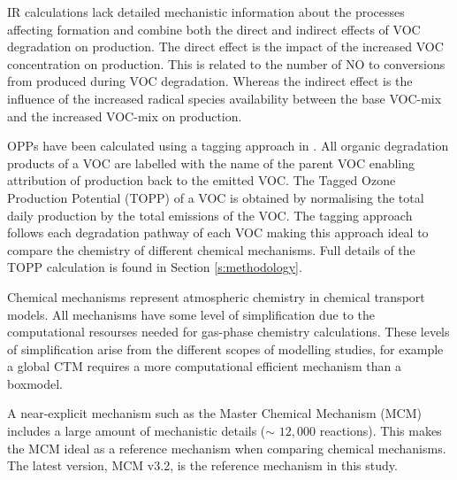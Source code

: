 
IR calculations lack detailed mechanistic information about the processes affecting  formation and combine both the direct and indirect effects of VOC degradation on  production. 
The direct effect is the impact of the increased VOC concentration on  production. 
This is related to the number of NO to  conversions from  produced during VOC degradation. 
Whereas the indirect effect is the influence of the increased radical species availability between the base VOC-mix and the increased VOC-mix on  production.

OPPs have been calculated using a tagging approach in \citet{Butler:2011}. 
All organic degradation products of a VOC are labelled with the name of the parent VOC enabling attribution of  production back to the emitted VOC. 
The Tagged Ozone Production Potential (TOPP) of a VOC is obtained by normalising the total daily  production by the total emissions of the VOC. 
The tagging approach follows each degradation pathway of each VOC making this approach ideal to compare the chemistry of different chemical mechanisms. 
Full details of the TOPP calculation is found in Section \ref{s:methodology}.

Chemical mechanisms represent atmospheric chemistry in chemical transport models. 
All mechanisms have some level of simplification due to the computational resourses needed for gas-phase chemistry calculations. 
These levels of simplification arise from the different scopes of modelling studies, for example a global CTM requires a more computational efficient mechanism than a boxmodel. 

A near-explicit mechanism such as the Master Chemical Mechanism (MCM) \citep{Jenkin:2003, Saunders:2003, Bloss:2005} includes a large amount of mechanistic details ($\sim$ $12,000$ reactions). 
This makes the MCM ideal as a reference mechanism when comparing chemical mechanisms. 
The latest version, MCM v3.2, \citep{MCM_Site} is the reference mechanism in this study.

